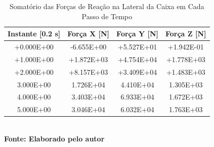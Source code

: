 		\begin{table}[!ht]
			\centering
			\caption{\hspace{0.1cm} Somatório das Forças de Reação na Lateral da Caixa em Cada Passo de Tempo}
			\vspace{-0.3cm} %
			\begin{tabular}{c|c|c|c}
			  \hline
			  \textbf{Instante [0.2 s]} & \textbf{Força X [N]} & \textbf{Força Y [N]} & \textbf{Força Z [N]} \\
			  \hline

			  \SI[{scientific-notation = engineering, round-precision=2}]{+0.000E+00}{} & 
			  \SI[{scientific-notation = engineering, round-precision=2}]{-6.655E+00}{} & 
			  \SI[{scientific-notation = engineering, round-precision=2}]{+5.527E+01}{} & 
			  \SI[{scientific-notation = engineering, round-precision=2}]{+1.942E-01}{} \\

			  \SI[{scientific-notation = engineering, round-precision=2}]{+1.000E+00}{} &
			  \SI[{scientific-notation = engineering, round-precision=2}]{+1.872E+03}{} &
			  \SI[{scientific-notation = engineering, round-precision=2}]{+4.754E+04}{} &
			  \SI[{scientific-notation = engineering, round-precision=2}]{+1.778E+03}{} \\

			  \SI[{scientific-notation = engineering, round-precision=2}]{+2.000E+00}{} &
			  \SI[{scientific-notation = engineering, round-precision=2}]{+8.157E+03}{} &
			  \SI[{scientific-notation = engineering, round-precision=2}]{+3.409E+04}{} &
			  \SI[{scientific-notation = engineering, round-precision=2}]{+1.483E+03}{} \\

			  \SI[{scientific-notation = engineering, round-precision=2}]{3.000E+00}{} &
			  \SI[{scientific-notation = engineering, round-precision=2}]{1.726E+04}{} &
			  \SI[{scientific-notation = engineering, round-precision=2}]{4.410E+04}{} &
			  \SI[{scientific-notation = engineering, round-precision=2}]{1.305E+03}{} \\

			  \SI[{scientific-notation = engineering, round-precision=2}]{4.000E+00}{} &
			  \SI[{scientific-notation = engineering, round-precision=2}]{3.403E+04}{} &
			  \SI[{scientific-notation = engineering, round-precision=2}]{6.933E+04}{} &
			  \SI[{scientific-notation = engineering, round-precision=2}]{1.672E+03}{} \\

			  \SI[{scientific-notation = engineering, round-precision=2}]{5.000E+00}{} &
			  \SI[{scientific-notation = engineering, round-precision=2}]{3.046E+04}{} &
			  \SI[{scientific-notation = engineering, round-precision=2}]{6.032E+04}{} &
			  \SI[{scientific-notation = engineering, round-precision=2}]{1.763E+03}{} \\
			  \hline
			\end{tabular}
			\\
			\small{\textbf{\footnotesize Fonte: Elaborado pelo autor}}
			\label{tab2}
		\end{table}
			
